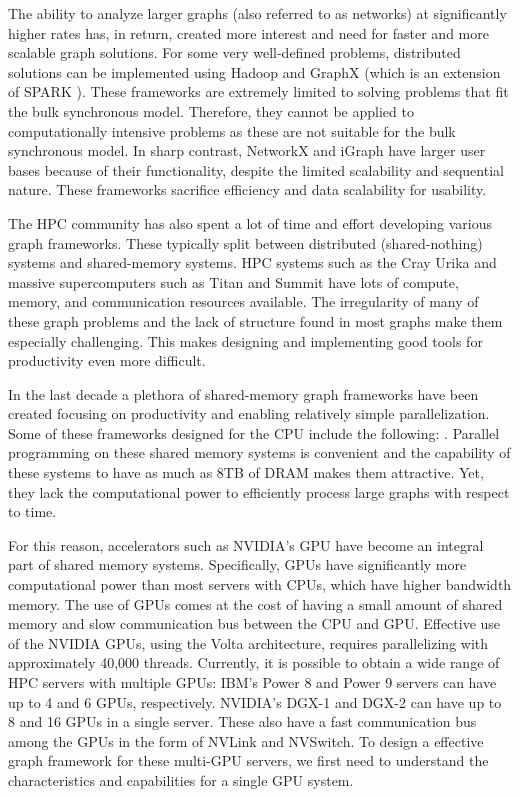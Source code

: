 The ability to analyze larger graphs (also referred to as networks) at significantly higher rates has, in return, created more interest and need for faster and more scalable graph solutions. For some very well-defined problems, distributed solutions can be implemented using Hadoop \cite{White:2009:HDG:1717298} and GraphX \cite{gonzalez2014graphx} (which is an extension of SPARK \cite{zaharia2010spark}). These frameworks are extremely limited to solving problems that fit the bulk synchronous model. Therefore, they cannot be applied to computationally intensive problems as these are not suitable for the bulk synchronous model. In sharp contrast, NetworkX\cite{SciPyProceedings_11} and iGraph\cite{Han:2010:IFC:1920841.1920901} have larger user bases because of their functionality, despite the limited scalability and sequential nature. These frameworks sacrifice efficiency and data scalability for usability.

The HPC community has also spent a lot of time and effort developing various graph frameworks. These typically split between distributed (shared-nothing) systems and shared-memory systems. HPC systems such as the Cray Urika and massive supercomputers such as Titan and Summit have lots of compute, memory, and communication resources available. The irregularity of many of these graph problems and the lack of structure found in most graphs make them especially challenging. This makes designing and implementing good tools for productivity even more difficult. 

In the last decade a plethora of shared-memory graph frameworks have been created focusing on productivity and enabling relatively simple parallelization. Some of these frameworks designed for the CPU include the following: \cite{stinger-tr,shun2013ligra,beamer2015gap,pingali2011tao,Sundaram:2015:GHP:2809974.2809983}. 
Parallel programming on these shared memory systems is convenient and the capability of these systems to have as much as 8TB of DRAM makes them attractive. Yet, they lack the computational power to efficiently process large graphs with respect to time. 

For this reason, accelerators such as NVIDIA's GPU have become an integral part of shared memory systems. Specifically, GPUs have significantly more computational power than most servers with CPUs, which have higher bandwidth memory. The use of GPUs comes at the cost of having a small amount of shared memory and slow communication bus between the CPU and GPU\@. Effective use of the NVIDIA GPUs, using the Volta architecture, requires parallelizing with approximately 40,000 threads. 
Currently, it is possible to obtain a wide range of HPC servers with multiple GPUs: IBM's Power 8 and Power 9 servers can have up to 4 and 6 GPUs, respectively. NVIDIA's DGX-1 and DGX-2 can have up to 8 and 16 GPUs in a single server. These also have a fast communication bus among the GPUs in the form of NVLink and NVSwitch\cite{foley2017ultra}.
To design a effective graph framework for these multi-GPU servers, we first need to understand the characteristics and capabilities for a single GPU system.

